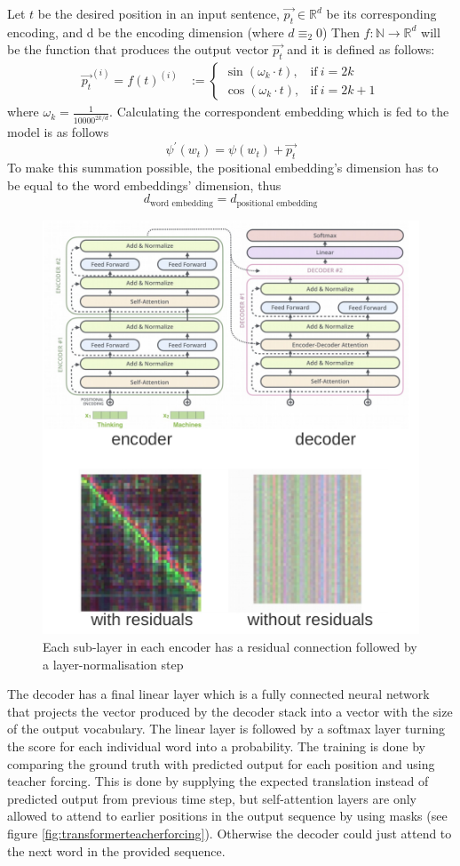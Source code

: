 \documentclass[11pt]{article}
\begin{document}
Let $t$ be the desired position in an input sentence, $\vec{p_t} \in \mathbb{R}^d$ be its corresponding encoding, and d be the encoding dimension (where $d \equiv_2 0$) Then $f:\mathbb{N}\rightarrow\mathbb{R}^d$ will be the function that produces the output vector $\vec{p_t}$ and it is defined as follows:
\begin{align*}
	\vec{p_t}^{(i)} = f(t)^{(i)} & := 
	\begin{cases}
		\sin({\omega_k} \cdot t),  & \text{if}\  i = 2k \\
		\cos({\omega_k} \cdot t),  & \text{if}\  i = 2k + 1
	\end{cases}
\end{align*}
where $\omega_k = \frac{1}{10000^{2k / d}}$. Calculating the correspondent embedding which is fed to the model is as follows
\begin{equation*}
	\psi^\prime(w_t) = \psi(w_t) + \vec{p_t}
\end{equation*}
To make this summation possible, the positional embedding’s dimension has to be equal to the word embeddings’ dimension, thus
\begin{equation*}
	d_{\text{word embedding}} = d_{\text{positional embedding}}
\end{equation*}

\begin{figure}[tbh]
	\centering
	\includegraphics[width=0.5\linewidth]{img/transformer_attention_residuals}
	\caption{Each sub-layer in each encoder has a residual connection followed by a layer-normalisation step}
	\label{fig:transformerattentionresiduals}
\end{figure}

The decoder has a final linear layer which is  a fully connected neural network that projects the vector produced by the decoder stack into a vector with the size of the output vocabulary. The linear layer is followed by a softmax layer turning the score for each individual word into a probability. The training is done by comparing the ground truth with predicted output for each position and using teacher forcing. This is done by supplying the expected translation instead of predicted output from previous time step, but self-attention layers are only allowed to attend to earlier positions in the output sequence by using masks (see figure \ref{fig:transformerteacherforcing}). Otherwise the decoder could just attend to the next word in the provided sequence.
\end{document}
